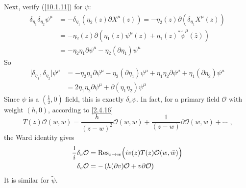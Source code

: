 \begin{tcolorbox}[breakable]
	Next, verify (\ref{10.1.11}) for $\psi$:
	\begin{align*}
		\delta _{\eta _{1}}\delta _{\eta _{2}}\psi ^{\mu } &=-\delta _{\eta
			_{1}}\left( \eta _{2}(z)\partial X^{\mu }(z)\right) =-\eta _{2}(z)\partial
		(\delta _{\eta _{1}}X^{\mu }(z)) \\
		&=-\eta _{2}(z)\partial (\eta _{1}(z)\psi ^{\mu }(z)+\eta _{1}(z)^{\ast }%
		\tilde{\psi}^{\mu }(\bar{z})) \\
		&=-\eta _{2}\eta _{1}\partial \psi ^{\mu }-\eta _{2}(\partial \eta
		_{1})\psi ^{\mu }
	\end{align*}%
	So \begin{align*}
		\lbrack \delta _{\eta _{1}},\delta _{\eta _{2}}]\psi ^{\mu } &=-\eta
		_{2}\eta _{1}\partial \psi ^{\mu }-\eta _{2}(\partial \eta _{1})\psi ^{\mu
		}+\eta _{1}\eta _{2}\partial \psi ^{\mu }+\eta _{1}(\partial \eta _{2})\psi
		^{\mu } \\
		&=2\eta _{1}\eta _{2}\partial \psi ^{\mu }+\partial (\eta _{1}\eta
		_{2})\psi ^{\mu }
	\end{align*}%
	Since $\psi$ is a $(\frac{1}{2},0)$ field, this is exactly $\delta _{v}\psi $. In fact, for a primary field $\mathcal{O}$ with weight $(h,0)$, according to \eqref{2.4.16} \[
	T(z)\mathcal{O}(w,\bar{w})=\frac{h}{(z-w)^{2}}\mathcal{O}(w,\bar{w})+\frac{1}{(z-w)}\partial \mathcal{O}(w,%
	\bar{w})+\cdots \text{ ,}
	\]%
	the Ward identity gives \begin{align*}
		\frac{1}{\mi }\delta _{v}\mathcal{O} &=\operatorname{Res}_{z\to w}\Bigl(\mi v(z)T(z)\mathcal{O}(w,%
		\bar{w})\Bigr) \\
		\delta _{v}\mathcal{O} &=-\left( h(\partial v)\mathcal{O}+v\partial \mathcal{O}\right)
	\end{align*}
	It is similar for $\tilde{\psi}$.
	

\end{tcolorbox}
